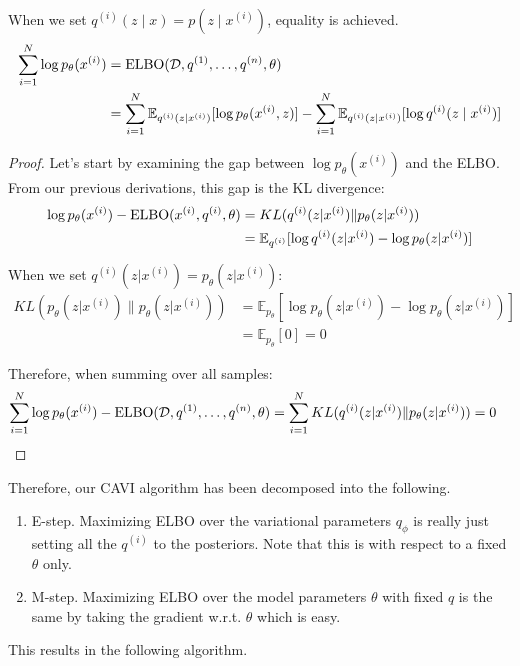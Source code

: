   \begin{theorem} 
    When we set $q^(i) (z \mid x) = p(z \mid x^{(i)})$, equality is achieved. 
    \begin{align}
      \sum_{i=1}^N \log p_{\theta} (x^{(i)}) & = \operatorname{ELBO}(\mathcal{D}, q^{(1)}, \ldots, q^{(n)}, \theta) \\ 
                                             & = \sum_{i=1}^N \mathbb{E}_{q^{(i)} (z \mid x^{(i)})} [ \log p_{\theta} (x^{(i)}, z)] - \sum_{i=1}^N \mathbb{E}_{q^{(i)} (z \mid x^{(i)})} [ \log q^{(i)} (z \mid x^{(i)}) ]
    \end{align}
  \end{theorem}
  \begin{proof}
    Let's start by examining the gap between $\log p_\theta(x^{(i)})$ and the ELBO. From our previous derivations, this gap is the KL divergence:
    \begin{align}
      \log p_\theta(x^{(i)}) - \operatorname{ELBO}(x^{(i)}, q^{(i)}, \theta) &= KL(q^{(i)}(z|x^{(i)}) \| p_\theta(z|x^{(i)})) \\
      &= \mathbb{E}_{q^{(i)}}[\log q^{(i)}(z|x^{(i)}) - \log p_\theta(z|x^{(i)})]
    \end{align}

    When we set $q^{(i)}(z|x^{(i)}) = p_\theta(z|x^{(i)})$:
    \begin{align}
      KL(p_\theta(z|x^{(i)}) \| p_\theta(z|x^{(i)})) &= \mathbb{E}_{p_\theta}[\log p_\theta(z|x^{(i)}) - \log p_\theta(z|x^{(i)})] \\
      &= \mathbb{E}_{p_\theta}[0] = 0
    \end{align}

    Therefore, when summing over all samples:
    \begin{align}
      \sum_{i=1}^N \log p_\theta(x^{(i)}) - \operatorname{ELBO}(\mathcal{D}, q^{(1)}, \ldots, q^{(n)}, \theta) &= \sum_{i=1}^N KL(q^{(i)}(z|x^{(i)}) \| p_\theta(z|x^{(i)})) = 0
    \end{align}
  \end{proof} 

  Therefore, our CAVI algorithm has been decomposed into the following. 
  \begin{enumerate}
    \item E-step. Maximizing ELBO over the variational parameters $q_\phi$ is really just setting all the $q^{(i)}$ to the posteriors. Note that this is with respect to a fixed $\theta$ only. 
    \item M-step. Maximizing ELBO over the model parameters $\theta$ with fixed $q$ is the same by taking the gradient w.r.t. $\theta$ which is easy. 
  \end{enumerate}
  This results in the following algorithm. 

